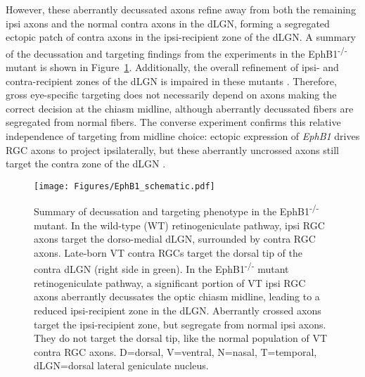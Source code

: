 However, these aberrantly decussated axons refine away from both the remaining ipsi axons and the normal contra axons in the dLGN, forming a segregated ectopic patch of contra axons in the ipsi-recipient zone of the dLGN.
A summary of the decussation and targeting findings from the experiments in the EphB1\textsuperscript{-/-} mutant is shown in Figure~\ref{EphB1schematic}.
Additionally, the overall refinement of ipsi- and contra-recipient zones of the dLGN is impaired in these mutants \cite{rebsam2009switching}.
Therefore, gross eye-specific targeting does not necessarily depend on axons making the correct decision at the chiasm midline, although aberrantly decussated fibers are segregated from normal fibers.
The converse experiment confirms this relative independence of targeting from midline choice: ectopic expression of \emph{EphB1} drives RGC axons to project ipsilaterally, but these aberrantly uncrossed axons still target the contra zone of the dLGN \cite{rebsam2009switching}.
\begin{figure}[hbtp]
    \begin{center}
        \texttt{[image: Figures/EphB1\_schematic.pdf]}
        \caption[Summary of decussation and targeting phenotype in the EphB1\textsuperscript{-/-} mutant.]
        {Summary of decussation and targeting phenotype in the EphB1\textsuperscript{-/-} mutant.
        In the wild-type (WT) retinogeniculate pathway, ipsi RGC axons target the dorso-medial dLGN, surrounded by contra RGC axons.
        Late-born VT contra RGCs target the dorsal tip of the contra dLGN (right side in green).
        In the EphB1\textsuperscript{-/-} mutant retinogeniculate pathway, a significant portion of VT ipsi RGC axons aberrantly decussates the optic chiasm midline, leading to a reduced ipsi-recipient zone in the dLGN.
        Aberrantly crossed axons target the ipsi-recipient zone, but segregate from normal ipsi axons.
        They do not target the dorsal tip, like the normal population of VT contra RGC axons.
        D=dorsal, V=ventral, N=nasal, T=temporal, dLGN=dorsal lateral geniculate nucleus.}
        \label{EphB1schematic}
    \end{center}
\end{figure}
